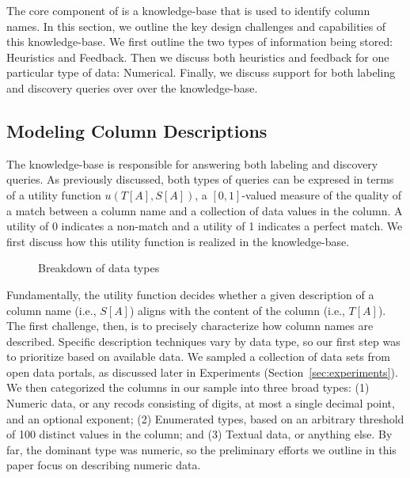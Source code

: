 
The core component of \systemname is a knowledge-base that is used to identify column names.
In this section, we outline the key design challenges and capabilities of this knowledge-base.  
We first outline the two types of information being stored: Heuristics and Feedback.
Then we discuss both heuristics and feedback for one particular type of data: Numerical.  
Finally, we discuss support for both labeling and discovery queries over over the knowledge-base.

\subsection{Modeling Column Descriptions}

The \systemname knowledge-base is responsible for answering both labeling and discovery queries.
As previously discussed, both types of queries can be expresed in terms of a utility function $u(T[A], S[A])$, a $[0,1]$-valued measure of the quality of a match between a column name and a collection of data values in the column.
A utility of 0 indicates a non-match and a utility of 1 indicates a perfect match.  
We first discuss how this utility function is realized in the \systemname knowledge-base.

\begin{figure}
\caption{Breakdown of data types}
\label{fig:type-breakdown}
\end{figure}

Fundamentally, the \systemname utility function decides whether a given description of a column name (i.e., $S[A]$) aligns with the content of the column (i.e., $T[A]$).  
The first challenge, then, is to precisely characterize how column names are described.
Specific description techniques vary by data type, so our first step was to prioritize based on available data.
We sampled a collection of \placeholder{\#\#\#} data sets from open data portals, as discussed later in Experiments (Section~\ref{sec:experiments}).
We then categorized the \placeholder{\#\#\#} columns in our sample into three broad types: 
(1) Numeric data, or any recods consisting of digits, at most a single decimal point, and an optional exponent; 
(2) Enumerated types, based on an arbitrary threshold of 100 distinct values in the column; and 
(3) Textual data, or anything else.  
By far, the dominant type was numeric, so the preliminary efforts we outline in this paper focus on describing numeric data.

